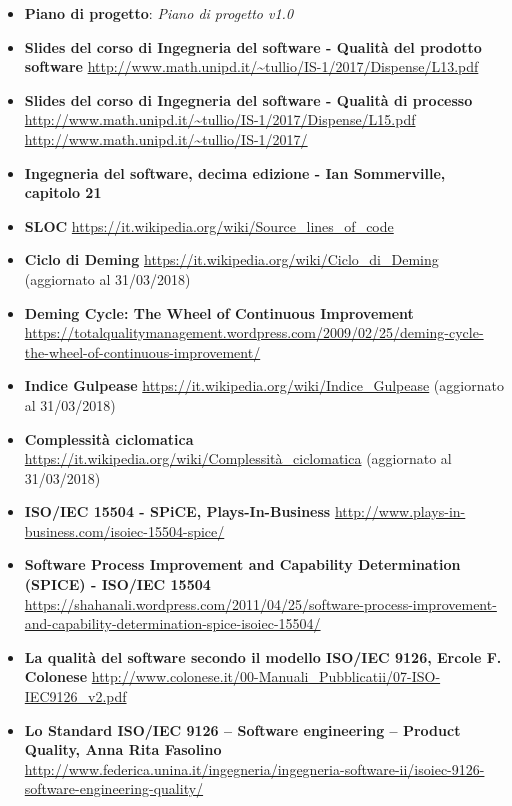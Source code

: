 \begin{itemize}
	\item
	\textbf{Piano di progetto}: \emph{Piano di progetto v1.0}
	\item
	\textbf{Slides del corso di Ingegneria del software - Qualità del prodotto software}
	\url{http://www.math.unipd.it/~tullio/IS-1/2017/Dispense/L13.pdf}
	\item
	\textbf{Slides del corso di Ingegneria del software - Qualità di processo}
	\url{http://www.math.unipd.it/~tullio/IS-1/2017/Dispense/L15.pdf}
	\url{http://www.math.unipd.it/~tullio/IS-1/2017/}
	\item 
	\textbf{Ingegneria del software, decima edizione - Ian Sommerville, capitolo 21} 
	\item
	\textbf{SLOC}
	\url{https://it.wikipedia.org/wiki/Source_lines_of_code}
	\item
	\textbf{Ciclo di Deming}
	\url{https://it.wikipedia.org/wiki/Ciclo_di_Deming} (aggiornato al 31/03/2018)
	\item
	\textbf{Deming Cycle: The Wheel of Continuous Improvement}
	\url{https://totalqualitymanagement.wordpress.com/2009/02/25/deming-cycle-the-wheel-of-continuous-improvement/}
	\item
	\textbf{Indice Gulpease}
	\url{https://it.wikipedia.org/wiki/Indice_Gulpease} (aggiornato al 31/03/2018)
	\item
	\textbf{Complessità ciclomatica}
	\url{https://it.wikipedia.org/wiki/Complessità_ciclomatica} (aggiornato al 31/03/2018)
	\item
	\textbf{ISO/IEC 15504 - SPiCE, Plays-In-Business}
	\url{http://www.plays-in-business.com/isoiec-15504-spice/}
	\item
	\textbf{Software Process Improvement and Capability Determination (SPICE) - ISO/IEC 15504}
	\url{https://shahanali.wordpress.com/2011/04/25/software-process-improvement-and-capability-determination-spice-isoiec-15504/}	
	\item
	\textbf{La qualità del software secondo il modello ISO/IEC 9126, Ercole F. Colonese}
	\url{http://www.colonese.it/00-Manuali_Pubblicatii/07-ISO-IEC9126_v2.pdf}
	\item
	\textbf{Lo Standard ISO/IEC 9126 – Software engineering – Product Quality, Anna Rita Fasolino}
	\url{http://www.federica.unina.it/ingegneria/ingegneria-software-ii/isoiec-9126-software-engineering-quality/}
\end{itemize}
